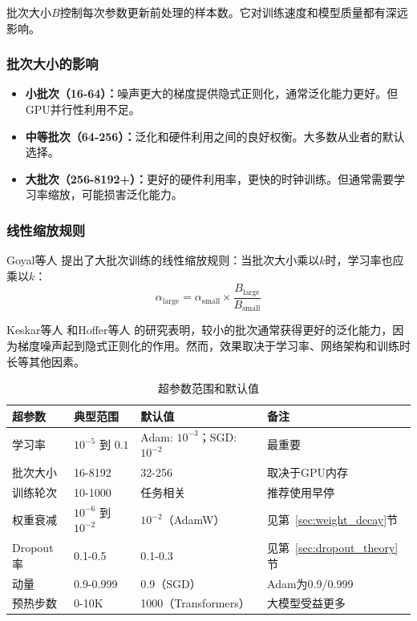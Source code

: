 批次大小$B$控制每次参数更新前处理的样本数。它对训练速度和模型质量都有深远影响。

\subsubsection{批次大小的影响}

\begin{itemize}
    \item \textbf{小批次（16-64）：}噪声更大的梯度提供隐式正则化，通常泛化能力更好。但GPU并行性利用不足。
    \item \textbf{中等批次（64-256）：}泛化和硬件利用之间的良好权衡。大多数从业者的默认选择。
    \item \textbf{大批次（256-8192+）：}更好的硬件利用率，更快的时钟训练。但通常需要学习率缩放，可能损害泛化能力。
\end{itemize}

\subsubsection{线性缩放规则}

Goyal等人 \cite{goyal2017accurate}提出了大批次训练的线性缩放规则：当批次大小乘以$k$时，学习率也应乘以$k$：
\begin{equation}
\alpha_{\text{large}} = \alpha_{\text{small}} \times \frac{B_{\text{large}}}{B_{\text{small}}}
\end{equation}

\begin{note}[批次大小与泛化]
Keskar等人 \cite{keskar2017largebatch}和Hoffer等人 \cite{hoffer2017train}的研究表明，较小的批次通常获得更好的泛化能力，因为梯度噪声起到隐式正则化的作用。然而，效果取决于学习率、网络架构和训练时长等其他因素。
\end{note}

\begin{table}[ht]
    \centering
    \caption{超参数范围和默认值}
    \begin{tabular}{L{2.8cm} L{3cm} L{3.5cm} L{3cm}}
        \toprule
        \textbf{超参数} & \textbf{典型范围} & \textbf{默认值} & \textbf{备注} \\
        \midrule
        学习率 & $10^{-5}$ 到 $0.1$ & Adam: $10^{-3}$；SGD: $10^{-2}$ & 最重要 \\
        批次大小 & 16-8192 & 32-256 & 取决于GPU内存 \\
        训练轮次 & 10-1000 & 任务相关 & 推荐使用早停 \\
        权重衰减 & $10^{-6}$ 到 $10^{-2}$ & $10^{-2}$（AdamW） & 见第~\ref{sec:weight_decay}节 \\
        Dropout率 & 0.1-0.5 & 0.1-0.3 & 见第~\ref{sec:dropout_theory}节 \\
        动量 & 0.9-0.999 & 0.9（SGD） & Adam为0.9/0.999 \\
        预热步数 & 0-10K & 1000（Transformers） & 大模型受益更多 \\
        \bottomrule
    \end{tabular}
\end{table}

